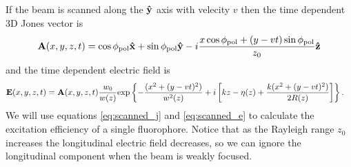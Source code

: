 \documentclass[11pt]{article}
\begin{document}
If the beam is scanned along the $\mathbf{\hat{y}}$ axis with velecity $v$ then the time
dependent 3D Jones vector is
\begin{align}
  \mathbf{A}(x,y,z,t) = \cos\phi_{\text{pol}}\mathbf{\hat{x}} + \sin\phi_{\text{pol}}\mathbf{\hat{y}} - i\frac{x\cos\phi_{\text{pol}} + (y - vt)\sin\phi_{\text{pol}}}{z_0}\mathbf{\hat{z}}\label{eq:scanned_j}
\end{align}
and the time dependent electric field is
\begin{align}
  \mathbf{E}(x,y,z,t) &= \mathbf{A}(x,y,z,t)\frac{w_0}{w(z)}\text{exp}\left\{{-\frac{(x^2+(y-vt)^2)}{w^2(z)}}+i\left[kz - \eta(z) + \frac{k(x^2+(y-vt)^2)}{2R(z)}\right]\right\}\label{eq:scanned_e}.
\end{align}
We will use equations \ref{eq:scanned_j} and \ref{eq:scanned_e} to calculate
the excitation efficiency of a single fluorophore. Notice that as the Rayleigh
range $z_0$ increases the longitudinal electric field decreases, so we can ignore the
longitudinal component when the beam is weakly focused.
\end{document}
